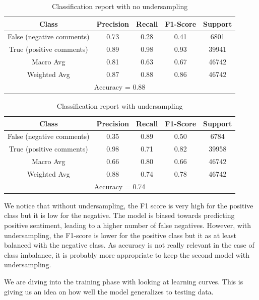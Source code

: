 \documentclass{article}
\begin{document}
\begin{table}[H]
  \centering
  \begin{tabular}{ccccc}
  \hline
  Class & Precision & Recall & F1-Score & Support \\
  \hline
  False (negative comments) & 0.73 & 0.28 & 0.41 & 6801 \\
  True (positive comments) & 0.89 & 0.98 & 0.93 & 39941 \\
  \hline
  Macro Avg & 0.81 & 0.63 & 0.67 & 46742 \\
  Weighted Avg & 0.87 & 0.88 & 0.86 & 46742 \\
  \hline
  \multicolumn{5}{c}{Accuracy = 0.88} \\
  \hline
  \end{tabular}
  \caption{Classification report with no undersampling}
  \label{tab:KNN}
\end{table}

\begin{table}[H]
  \centering
  \begin{tabular}{ccccc}
  \hline
  Class & Precision & Recall & F1-Score & Support \\
  \hline
  False (negative comments) & 0.35 & 0.89 & 0.50 & 6784 \\
  True (positive comments) & 0.98 & 0.71 & 0.82 & 39958 \\
  \hline
  Macro Avg & 0.66 & 0.80 & 0.66 & 46742 \\
  Weighted Avg & 0.88 & 0.74 & 0.78 & 46742 \\
  \hline
  \multicolumn{5}{c}{Accuracy = 0.74} \\
  \hline
  \end{tabular}
  \caption{Classification report with undersampling}
  \label{tab:classification_report}
\end{table}

We notice that without undersampling, the F1 score is very high for the positive class but it is low for the negative. The model is biased towards predicting positive sentiment, leading to a higher number of false negatives. 
However, with undersampling, the F1-score is lower for the positive class but it as at least balanced with the negative class. As accuracy is not really relevant in the case of class imbalance, it is probably more appropriate to keep the second model with undersampling.

We are diving into the training phase with looking at learning curves. This is giving us an idea on how well the model generalizes to testing data.
\end{document}
